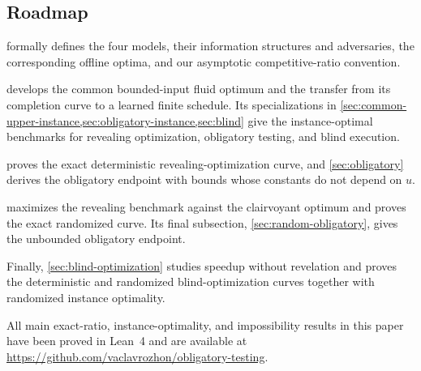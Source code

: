 \subsection{Roadmap}
\label{sec:roadmap}

 formally defines the four models, their information
structures and adversaries, the corresponding offline optima, and our
asymptotic competitive-ratio convention.

 develops the common bounded-input
fluid optimum and the transfer from its completion curve to a learned finite
schedule.  Its specializations in
\cref{sec:common-upper-instance,sec:obligatory-instance,sec:blind} give the
instance-optimal benchmarks for revealing optimization, obligatory testing,
and blind execution.

 proves the exact deterministic revealing-optimization
curve, and \cref{sec:obligatory} derives the obligatory endpoint with bounds
whose constants do not depend on $u$.

 maximizes the revealing benchmark against the
clairvoyant optimum and proves the exact randomized curve.  Its final
subsection, \cref{sec:random-obligatory}, gives the unbounded obligatory
endpoint.

Finally, \cref{sec:blind-optimization} studies speedup without revelation and
proves the deterministic and randomized blind-optimization curves together
with randomized instance optimality.

All main exact-ratio, instance-optimality, and impossibility results in this
paper have been proved in Lean~4 and are available at
\url{https://github.com/vaclavrozhon/obligatory-testing}.
